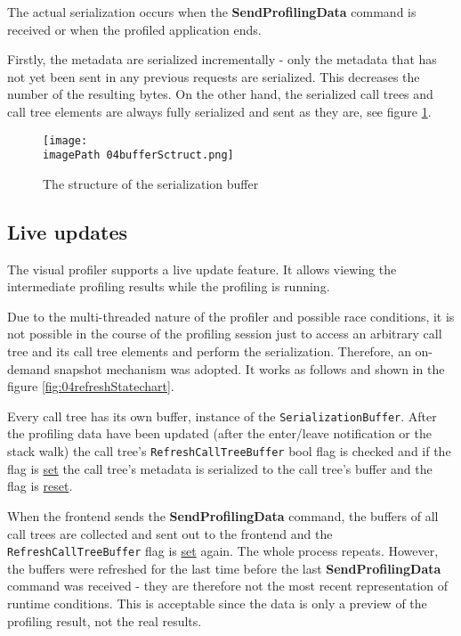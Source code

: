 The actual serialization occurs when the \textbf{SendProfilingData} command is received or when the profiled application ends. 

Firstly, the metadata are serialized incrementally - only the metadata that has not yet been sent in any previous requests are serialized. This decreases the number of the resulting bytes. On the other hand, the serialized call trees and call tree elements are always fully serialized and sent as they are, see figure \ref{fig:04bufferSctruct}.

\begin{figure}
	\centering
		\texttt{[image: \\imagePath 04bufferSctruct.png]}
		\caption{The structure of the serialization buffer }
	\label{fig:04bufferSctruct}
\end{figure}

\subsection{Live updates}
The visual profiler supports a live update feature. It allows viewing the intermediate profiling results while the profiling is running. 

Due to the multi-threaded nature of the profiler and possible race conditions, it is not possible in the course of the profiling session just to access an arbitrary call tree and its call tree elements and perform the serialization. Therefore, an on-demand snapshot mechanism was adopted. It works as follows and shown in the figure \ref{fig:04refreshStatechart}. 

Every call tree has its own buffer, instance of the \texttt{SerializationBuffer}. After the profiling data have been updated (after the enter/leave notification or the stack walk) the call tree's \texttt{RefreshCallTreeBuffer} bool flag is checked and if the flag is \underline{set} the call tree's metadata is serialized to the call tree's buffer and the flag is \underline{reset}. 

When the frontend sends the \textbf{SendProfilingData} command, the buffers of all call trees are collected and sent out to the frontend and the \texttt{RefreshCallTreeBuffer} flag is \underline{set} again. The whole process repeats. However, the buffers were refreshed for the last time before the last \textbf{SendProfilingData} command was received - they are therefore not the most recent representation of runtime conditions. This is acceptable since the data is only a preview of the profiling result, not the real results.

